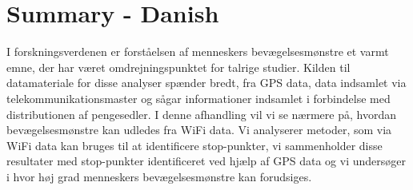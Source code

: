 \chapter{Summary - Danish}

I forskningsverdenen er forståelsen af menneskers bevægelsesmønstre et varmt
emne, der har været omdrejningspunktet for talrige studier. Kilden til
datamateriale for disse analyser spænder bredt, fra GPS data, data indsamlet via
telekommunikationsmaster og sågar informationer indsamlet i forbindelse med
distributionen af pengesedler. I denne afhandling vil vi se nærmere på, hvordan
bevægelsesmønstre kan udledes fra WiFi data. Vi analyserer metoder, som via WiFi
data kan bruges til at identificere stop-punkter, vi sammenholder disse
resultater med stop-punkter identificeret ved hjælp af GPS data og vi undersøger
i hvor høj grad menneskers bevægelsesmønstre kan forudsiges.